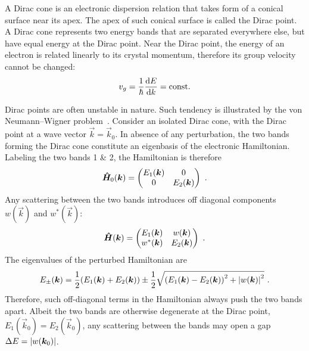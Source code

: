 ﻿A Dirac cone is an electronic dispersion relation that takes form of a conical surface near its apex. The apex of such conical surface is called the Dirac point. A Dirac cone represents two energy bands that are separated everywhere else, but have equal energy at the Dirac point. Near the Dirac point, the energy of an electron is related linearly to its crystal momentum, therefore its group velocity cannot be changed:%
\begin{equation}
    v_g = \frac{1}{\hbar}\frac{\mathop{}\!\mathrm{d} E}{\mathop{}\!\mathrm{d} k} = \mathrm{const.}
\end{equation}

Dirac points are often unstable in nature. Such tendency is illustrated by the von Neumann--Wigner problem~\cite{vonNeumann1993, Asano2011}. Consider an isolated Dirac cone, with the Dirac point at a wave vector $\vec{k}=\vec{k}_0$. In absence of any perturbation, the two bands forming the Dirac cone constitute an eigenbasis of the electronic Hamiltonian. Labeling the two bands 1 \& 2, the Hamiltonian is therefore%
\begin{equation}
    \op{H}_0(\vec{k}) = %
        \begin{pmatrix}
            E_1(\vec{k}) & 0\\
            0 & E_2(\vec{k})
        \end{pmatrix}~.
\end{equation}%
Any scattering between the two bands introduces off diagonal components $w(\vec{k})$ and $w^*(\vec{k})$:%
\begin{equation}
    \op{H}(\vec{k}) = %
        \begin{pmatrix}
            E_1(\vec{k}) & w(\vec{k})\\
            w^*(\vec{k}) & E_2(\vec{k})
        \end{pmatrix}~.
\end{equation}%
The eigenvalues of the perturbed Hamiltonian are
\begin{equation}
    E_\pm(\vec{k}) = \frac{1}{2} \qty(E_1(\vec{k}) + E_2(\vec{k})) \pm \frac{1}{2} \sqrt{\qty(E_1(\vec{k}) - E_2(\vec{k}))^2 + \abs{w(\vec{k})}^2}~.
\end{equation}
Therefore, such off-diagonal terms in the Hamiltonian always push the two bands apart. Albeit the two bands are otherwise degenerate at the Dirac point, $E_1(\vec{k}_0) = E_2(\vec{k}_0)$, any scattering between the bands may open a gap $\Delta{}E = \abs{w(\vec{k}_0)}$.

